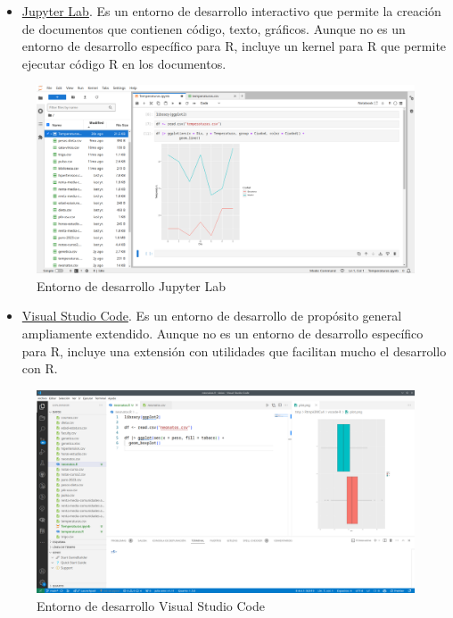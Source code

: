 \documentclass[
  a4paper,
]{scrreport}
\providecommand{\tightlist}{%
  \setlength{\itemsep}{0pt}\setlength{\parskip}{0pt}}\usepackage{longtable,booktabs,array}
\theoremstyle{definition}
\theoremstyle{remark}
\begin{document}
\begin{itemize}
\tightlist
\item
  \href{https://jupyter.org/}{Jupyter Lab}. Es un entorno de desarrollo
  interactivo que permite la creación de documentos que contienen
  código, texto, gráficos. Aunque no es un entorno de desarrollo
  específico para R, incluye un kernel para R que permite ejecutar
  código R en los documentos.
\end{itemize}

\begin{figure}[H]

{\centering \includegraphics[width=8.33333in,height=\textheight,keepaspectratio]{img/jupyter-lab.png}

}

\caption{Entorno de desarrollo Jupyter Lab}

\end{figure}%

\begin{itemize}
\tightlist
\item
  \href{https://code.visualstudio.com/}{Visual Studio Code}. Es un
  entorno de desarrollo de propósito general ampliamente extendido.
  Aunque no es un entorno de desarrollo específico para R, incluye una
  extensión con utilidades que facilitan mucho el desarrollo con R.
\end{itemize}

\begin{figure}[H]

{\centering \includegraphics[width=8.33333in,height=\textheight,keepaspectratio]{img/vscode-r.png}

}

\caption{Entorno de desarrollo Visual Studio Code}

\end{figure}%
\end{document}
